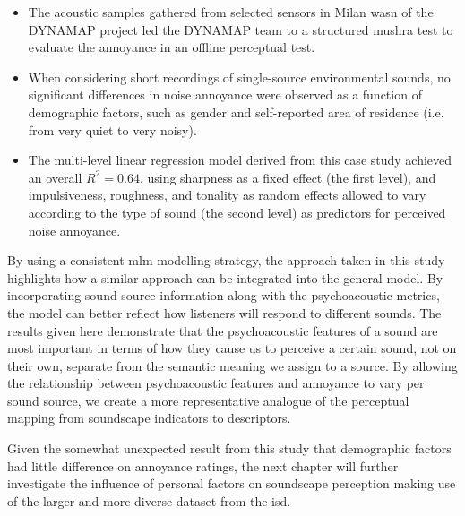 \begin{itemize}
  \item The acoustic samples gathered from selected sensors in Milan \gls{wasn} of the DYNAMAP project led the DYNAMAP team to a structured \gls{mushra} test to evaluate the annoyance in an offline perceptual test.
  \item When considering short recordings of single-source environmental sounds, no significant differences in noise annoyance were observed as a function of demographic factors, such as gender and self-reported area of residence (i.e. from very quiet to very noisy).
  \item The multi-level linear regression model derived from this case study achieved an overall $R^2=0.64$, using sharpness as a fixed effect (the first level), and impulsiveness, roughness, and tonality as random effects allowed to vary according to the type of sound (the second level) as predictors for perceived noise annoyance.
\end{itemize}

By using a consistent \gls{mlm} modelling strategy, the approach taken in this study highlights how a similar approach can be integrated into the general model. By incorporating sound source information along with the psychoacoustic metrics, the model can better reflect how listeners will respond to different sounds. The results given here demonstrate that the psychoacoustic features of a sound are most important in terms of how they cause us to perceive a certain sound, not on their own, separate from the semantic meaning we assign to a source. By allowing the relationship between psychoacoustic features and annoyance to vary per sound source, we create a more representative analogue of the perceptual mapping from soundscape indicators to descriptors. 

Given the somewhat unexpected result from this study that demographic factors had little difference on annoyance ratings, the next chapter will further investigate the influence of personal factors on soundscape perception making use of the larger and more diverse dataset from the \gls{isd}.



